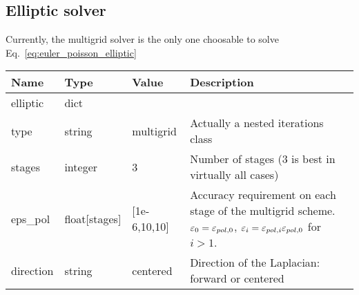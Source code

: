 \subsection{Elliptic solver}
Currently, the multigrid solver is the only one choosable
to solve Eq.~\eqref{eq:euler_poisson_elliptic}
\begin{longtable}{lllp{7.5cm}}
\toprule
\rowcolor{gray!50}\textbf{Name} &  \textbf{Type} & \textbf{Value}  & \textbf{Description}  \\ \midrule
elliptic & dict & & \\
\qquad type  & string& multigrid & Actually a nested iterations class \\
\qquad stages    & integer & 3 & Number of stages (3 is best in virtually all cases) \\
\qquad eps\_pol    & float[stages] & [1e-6,10,10] & Accuracy requirement on each stage of the multigrid scheme. $\varepsilon_0 = \varepsilon_{pol,0}$, $\varepsilon_i = \varepsilon_{pol,i} \varepsilon_{pol,0}$  for $i>1$. \\
\qquad direction & string & centered & Direction of the Laplacian: forward or centered \\
\bottomrule
\end{longtable}

